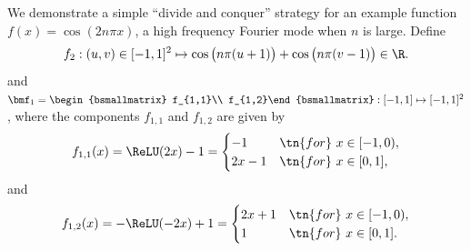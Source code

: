 \documentclass[review,hidelinks,onefignum,onetabnum]{siamart250211}
\begin{document}
We demonstrate a simple ``divide and conquer'' strategy for an example function 
$f(x)=\cos(2n\pi x)$, a high frequency Fourier mode when $n$ is large. 
Define
\begin{equation*}
     f_2:(u,v)\in [-1,1]^2 \mapsto 
    \cos\big(n\pi  (u+1)\big)+ \cos\big(n\pi  (v-1)\big)\in \R.
\end{equation*}
and 
$\bmf_1=\begin{bsmallmatrix}
    f_{1,1}\\  f_{1,2}\end{bsmallmatrix}:[-1,1]\mapsto[-1,1]^2$, where the components $f_{1,1}$ and $f_{1,2}$ are given by
\begin{equation}\label{eq:component:f11}
	f_{1,1}(x)=\ReLU(2x)-1=\begin{cases}
		-1 & \tn{for}\  x\in [-1,0),\\
		2x-1 & \tn{for}\  x\in [0,1],
	\end{cases}
\end{equation}
and
\begin{equation}\label{eq:component:f12}
	f_{1,2}(x)=-\ReLU(-2x)+1=\begin{cases}
		2x+1 & \tn{for}\  x\in [-1,0),\\
		1  & \tn{for}\  x\in [0,1].
	\end{cases}
\end{equation}
\end{document}
